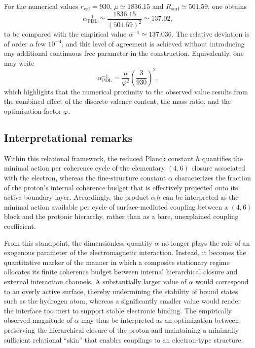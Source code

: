 \documentclass[12pt,a4paper]{article}
\begin{document}
For the numerical values \(r_{\text{val}}=930\), \(\mu\simeq 1836.15\) and \(R_{\text{surf}}\simeq 501.59\), one obtains
\[
  \alpha_{\text{PDL}}^{-1}
  \simeq
  \frac{1836.15}{(501.59)^2}
  \simeq 137.02,
\]
to be compared with the empirical value \(\alpha^{-1}\simeq 137.036\).
The relative deviation is of order a few \(10^{-4}\), and this level of agreement is achieved without introducing any additional continuous free parameter in the construction.\cite{Laubscher2026PDL_English,Laubscher2026LDP_French}
Equivalently, one may write
\[
  \alpha_{\text{PDL}}^{-1}
  =
  \frac{\mu}{\varphi^2}
  \left(\frac{3}{930}\right)^2,
\]
which highlights that the numerical proximity to the observed value results from the combined effect of the discrete valence content, the mass ratio, and the optimisation factor \(\varphi\).

\subsection{Interpretational remarks}

Within this relational framework, the reduced Planck constant \(\hbar\) quantifies the minimal action per coherence cycle of the elementary \((4,6)\) closure associated with the electron, whereas the fine-structure constant \(\alpha\) characterizes the fraction of the proton’s internal coherence budget that is effectively projected onto its active boundary layer.
Accordingly, the product \(\alpha\,\hbar\) can be interpreted as the minimal action available per cycle of surface-mediated coupling between a \((4,6)\) block and the protonic hierarchy, rather than as a bare, unexplained coupling coefficient.\cite{Laubscher2026PDL_English,Laubscher2026LDP_French}

From this standpoint, the dimensionless quantity \(\alpha\) no longer plays the role of an exogenous parameter of the electromagnetic interaction.
Instead, it becomes the quantitative marker of the manner in which a composite stationary regime allocates its finite coherence budget between internal hierarchical closure and external interaction channels.
A substantially larger value of \(\alpha\) would correspond to an overly active surface, thereby undermining the stability of bound states such as the hydrogen atom, whereas a significantly smaller value would render the interface too inert to support stable electronic binding.
The empirically observed magnitude of \(\alpha\) may thus be interpreted as an optimization between preserving the hierarchical closure of the proton and maintaining a minimally sufficient relational “skin” that enables couplings to an electron-type structure.
\end{document}
